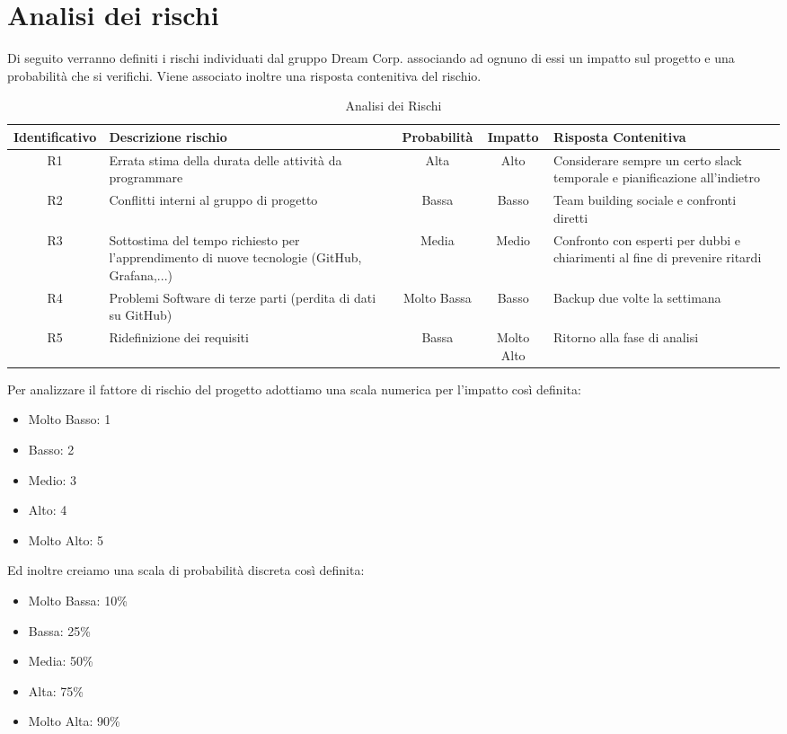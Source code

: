 \section{Analisi dei rischi}

	Di seguito verranno definiti i rischi individuati dal gruppo Dream Corp. associando ad ognuno di essi un impatto sul progetto e una probabilità che si verifichi. Viene associato inoltre una risposta contenitiva del rischio. 
	\begin{table}[h!]
		\centering
		\renewcommand{\arraystretch}{2} 
		\begin{tabular}{|c|p{3.6cm}|c|c|p{3.6cm}|}
			\rowcolor{orange!50}
			\hline
			\textbf{Identificativo} & \textbf{Descrizione rischio} & \textbf{Probabilità} & \textbf{Impatto} & \textbf{Risposta Contenitiva}\\
			\hline
			R1 & Errata stima della durata delle attività da programmare & Alta & Alto & Considerare sempre un certo slack temporale e pianificazione all’indietro\\
			\hline
			R2 & Conflitti interni al gruppo di progetto & Bassa & Basso & Team building sociale e confronti diretti\\
			\hline
			R3 & Sottostima del tempo richiesto per l’apprendimento di nuove tecnologie (GitHub, Grafana,...) & Media & Medio & Confronto con esperti per dubbi e chiarimenti al fine di prevenire ritardi\\
			\hline
			R4 & Problemi Software di terze parti (perdita di dati su GitHub) & Molto  Bassa & Basso &  Backup due volte la settimana\\
			\hline
			R5 & Ridefinizione dei requisiti & Bassa & Molto Alto & Ritorno alla fase di analisi\\
			\hline
		\end{tabular}
		\caption{Analisi dei Rischi}
	\end{table}
	\clearpage
	Per analizzare il fattore di rischio del progetto adottiamo una scala numerica per l’impatto così definita:
	\begin{itemize}
		\item Molto Basso: 1
		\item Basso: 2
		\item Medio: 3
		\item Alto: 4
		\item Molto Alto: 5
	\end{itemize}
	Ed inoltre creiamo una scala di probabilità discreta così definita:
	\begin{itemize}
		\item Molto Bassa: 10\%
		\item Bassa: 25\%
		\item Media: 50\%
		\item Alta: 75\%
		\item Molto Alta: 90\%
	\end{itemize}
